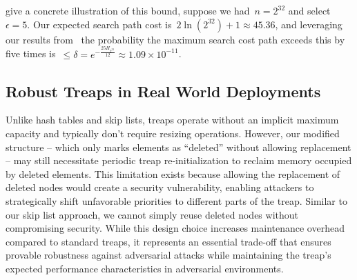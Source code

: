 give a concrete illustration of this bound, suppose we had~$n = 2^{32}$ and select~$\epsilon = 5$. Our expected search path cost is~$2 \ln(2^{32}) + 1 \approx 45.36$, and leveraging our results from~ the probability the maximum search cost path exceeds this by five times is~$\leq \delta = e^{-\frac{25 H_{2^{32}}}{12}} \approx 1.09 \times 10^{-11}$.

\subsection{Robust Treaps in Real World Deployments}

Unlike hash tables and skip lists, treaps operate without an implicit maximum capacity and typically don't require resizing operations. However, our modified structure -- which only marks elements as ``deleted'' without allowing replacement -- may still necessitate periodic treap re-initialization to reclaim memory occupied by deleted elements. This limitation exists because allowing the replacement of deleted nodes would create a security vulnerability, enabling attackers to strategically shift unfavorable priorities to different parts of the treap. Similar to our skip list approach, we cannot simply reuse deleted nodes without compromising security. While this design choice increases maintenance overhead compared to standard treaps, it represents an essential trade-off that ensures provable robustness against adversarial attacks while maintaining the treap's expected performance characteristics in adversarial environments.